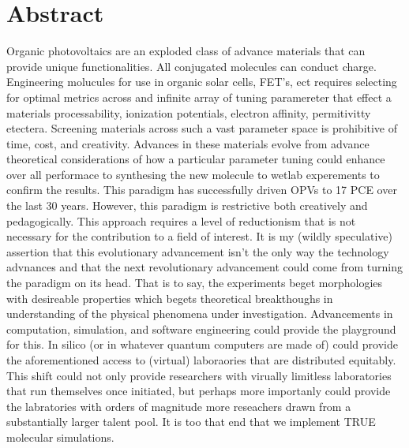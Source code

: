 
\chapter*{Abstract}

Organic photovoltaics are an exploded class of advance materials that can provide unique functionalities.
All conjugated molecules can conduct charge. Engineering molucules for use in organic solar cells, FET's, ect
requires selecting for optimal metrics across and infinite array of tuning paramereter that effect a materials
processability, ionization potentials, electron affinity, permitivitty etectera. Screening materials across
such a vast parameter space is prohibitive of time, cost, and creativity. Advances in these materials evolve
from advance theoretical considerations of how a particular parameter tuning could enhance over all performace
to synthesing the new molecule to wetlab experements to confirm the results. This paradigm has successfully
driven OPVs to 17 PCE over the last 30 years. However, this paradigm is restrictive both creatively and
pedagogically. This approach requires a level of reductionism that is not necessary for the contribution to a
field of interest. It is my (wildly speculative) assertion that this evolutionary advancement isn't the only
way the technology advnances and that the next revolutionary advancement could come from turning the paradigm
on its head. That is to say, the experiments beget morphologies with desireable properties which begets
theoretical breakthoughs in understanding of the physical phenomena under investigation. Advancements in
computation, simulation, and software engineering could provide the playground for this. In silico (or in
whatever quantum computers are made of) could provide the aforementioned access to (virtual) laboraories that
are distributed equitably. This shift could not only provide researchers with virually limitless 
laboratories that run themselves once initiated, but perhaps more importanly could provide the labratories
with orders of magnitude more reseachers drawn from a substantially larger talent pool. It is too that end
that we implement TRUE molecular simulations.    


